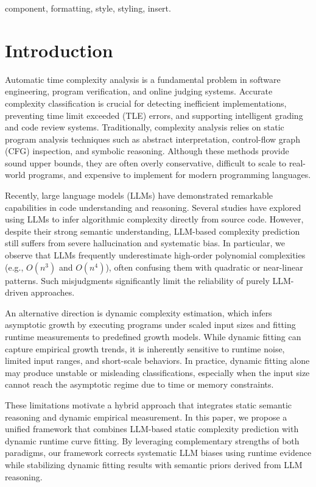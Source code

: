 \documentclass[conference]{IEEEtran}
\begin{document}
\begin{IEEEkeywords}
component, formatting, style, styling, insert.
\end{IEEEkeywords}

\section{Introduction}
Automatic time complexity analysis is a fundamental problem in software engineering, program verification, and online judging systems. Accurate complexity classification is crucial for detecting inefficient implementations, preventing time limit exceeded (TLE) errors, and supporting intelligent grading and code review systems. Traditionally, complexity analysis relies on static program analysis techniques such as abstract interpretation, control-flow graph (CFG) inspection, and symbolic reasoning. Although these methods provide sound upper bounds, they are often overly conservative, difficult to scale to real-world programs, and expensive to implement for modern programming languages. 

Recently, large language models (LLMs) have demonstrated remarkable capabilities in code understanding and reasoning. Several studies have explored using LLMs to infer algorithmic complexity directly from source code. However, despite their strong semantic understanding, LLM-based complexity prediction still suffers from severe hallucination and systematic bias. In particular, we observe that LLMs frequently underestimate high-order polynomial complexities (e.g., $O(n^3)$ and $O(n^4)$), often confusing them with quadratic or near-linear patterns. Such misjudgments significantly limit the reliability of purely LLM-driven approaches. 

An alternative direction is dynamic complexity estimation, which infers asymptotic growth by executing programs under scaled input sizes and fitting runtime measurements to predefined growth models. While dynamic fitting can capture empirical growth trends, it is inherently sensitive to runtime noise, limited input ranges, and short-scale behaviors. In practice, dynamic fitting alone may produce unstable or misleading classifications, especially when the input size cannot reach the asymptotic regime due to time or memory constraints. 

These limitations motivate a hybrid approach that integrates static semantic reasoning and dynamic empirical measurement. In this paper, we propose a unified framework that combines LLM-based static complexity prediction with dynamic runtime curve fitting. By leveraging complementary strengths of both paradigms, our framework corrects systematic LLM biases using runtime evidence while stabilizing dynamic fitting results with semantic priors derived from LLM reasoning. 
\end{document}
